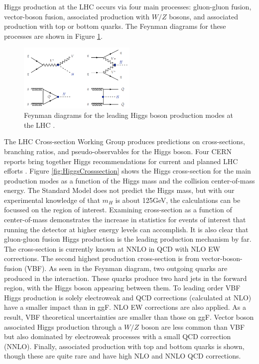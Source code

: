 Higgs production at the LHC occurs via four main processes: gluon-gluon fusion, vector-boson fusion, associated production with $W/Z$ bosons, and associated production with top or bottom quarks. The Feynman diagrams for these processes are shown in Figure \ref{fig:FeynmannHiggs}.  

\begin{figure}[H]
        \centering
    \includegraphics[width=0.5\textwidth] {Pictures/FeynmannHiggs.png}\hspace{1cm}
    \caption{Feynman diagrams for the leading Higgs boson production modes at the LHC \cite{Djouadi}.}
    \label{fig:FeynmannHiggs}
\end{figure}

The LHC Cross-section Working Group produces predictions on cross-sections, branching ratios, and pseudo-observables for the Higgs boson. Four CERN reports bring together Higgs recommendations for current and planned LHC efforts \cite{LHCCrossSectionWG}. Figure \ref{fig:HiggsCrosssection} shows the Higgs cross-section for the main production modes as a function of the Higgs mass and the collision center-of-mass energy. The Standard Model does not predict the Higgs mass, but with our experimental knowledge of that $m_H$ is about 125GeV, the calculations can be focussed on the region of interest. Examining cross-section as a function of center-of-mass demonstrates the increase in statistics for events of interest that running the detector at higher energy levels can accomplish. It is also clear that gluon-gluon fusion Higgs production is the leading production mechanism by far. The cross-section is currently known at NNLO in QCD with NLO EW corrections. The second highest production cross-section is from vector-boson-fusion (VBF). As seen in the Feynman diagram, two outgoing quarks are produced in the interaction. These quarks produce two hard jets in the forward region, with the Higgs boson appearing between them. To leading order VBF Higgs production is solely electroweak and QCD corrections (calculated at NLO) have a smaller impact than in ggF. NLO EW corrections are also applied. As a result, VBF theoretical uncertainties are smaller than those on ggF. Vector boson associated Higgs production through a $W/Z$ boson are less common than VBF but also dominated by electroweak processes with a small QCD correction (NNLO). Finally, associated production with top and bottom quarks is shown, though these are quite rare and have high NLO and NNLO QCD corrections. 

